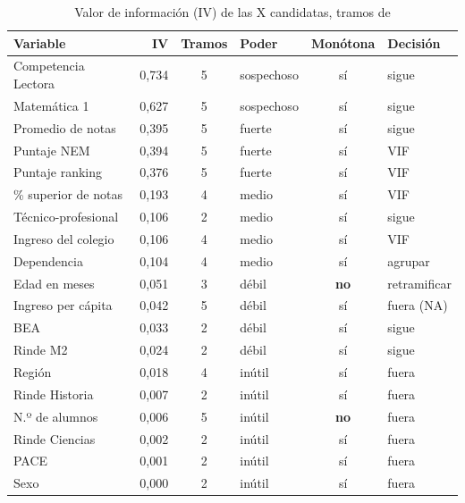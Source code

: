 \documentclass[11pt]{article}
\newcommand{\cod}[1]{\texttt{\detokenize{#1}}}
\begin{document}
\begin{table}[H]
\centering
\caption{Valor de información (IV) de las X candidatas, tramos de \cod{woebin}}
\label{tab:iv}
\begin{tabular}{l r c l c l}
\toprule
\textbf{Variable} & \textbf{IV} & \textbf{Tramos} & \textbf{Poder} & \textbf{Monótona} & \textbf{Decisión} \\
\midrule
Competencia Lectora & 0,734 & 5 & sospechoso & sí & sigue \\
Matemática 1 & 0,627 & 5 & sospechoso & sí & sigue \\
Promedio de notas & 0,395 & 5 & fuerte & sí & sigue \\
Puntaje NEM & 0,394 & 5 & fuerte & sí & VIF \\
Puntaje ranking & 0,376 & 5 & fuerte & sí & VIF \\
\% superior de notas & 0,193 & 4 & medio & sí & VIF \\
Técnico-profesional & 0,106 & 2 & medio & sí & sigue \\
Ingreso del colegio & 0,106 & 4 & medio & sí & VIF \\
Dependencia & 0,104 & 4 & medio & sí & agrupar \\
Edad en meses & 0,051 & 3 & débil & \textbf{no} & retramificar \\
Ingreso per cápita & 0,042 & 5 & débil & sí & fuera (NA) \\
BEA & 0,033 & 2 & débil & sí & sigue \\
Rinde M2 & 0,024 & 2 & débil & sí & sigue \\
\midrule
Región & 0,018 & 4 & inútil & sí & fuera \\
Rinde Historia & 0,007 & 2 & inútil & sí & fuera \\
N.º de alumnos & 0,006 & 5 & inútil & \textbf{no} & fuera \\
Rinde Ciencias & 0,002 & 2 & inútil & sí & fuera \\
PACE & 0,001 & 2 & inútil & sí & fuera \\
Sexo & 0,000 & 2 & inútil & sí & fuera \\
\bottomrule
\end{tabular}
\end{table}
\end{document}
